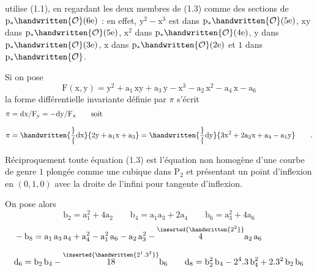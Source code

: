 utilise (1.1), en regardant les deux membres de (1.3) comme des sections de $\mathrm{p}_{*}\handwritten{\mathcal{O}}(6\mathrm{e})$ : en effet, $\mathrm{y}^{2}-\mathrm{x}^{3}$ est dans $\mathrm{p}_{*}\handwritten{\mathcal{O}}(5\mathrm{e})$, $\mathrm{xy}$ dans $\mathrm{p}_{*}\handwritten{\mathcal{O}}(5\mathrm{e})$, $\mathrm{x}^{2}$ dans $\mathrm{p}_{*}\handwritten{\mathcal{O}}(4\mathrm{e})$, $\mathrm{y}$ dans $\mathrm{p}_{*}\handwritten{\mathcal{O}}(3\mathrm{e})$, $\mathrm{x}$ dans $\mathrm{p}_{*}\handwritten{\mathcal{O}}(2\mathrm{e})$ et $1$ dans $\mathrm{p}_{*}\handwritten{\mathcal{O}}$.

Si on pose
\[
\mathrm{F}(\mathrm{x},\mathrm{y})=\mathrm{y}^{2}+\mathrm{a}_{1}\,\mathrm{xy}+\mathrm{a}_{3}\,\mathrm{y}-\mathrm{x}^{3}-\mathrm{a}_{2}\,\mathrm{x}^{2}-\mathrm{a}_{4}\,\mathrm{x}-\mathrm{a}_{6}
\]
la forme différentielle invariante définie par $\pi$ s'écrit
\[
\begin{aligned}
\pi&=\mathrm{dx}/\mathrm{F}_{\mathrm{y}}=-\mathrm{dy}/\mathrm{F}_{\mathrm{x}}\qquad\text{soit}\\[.65em]
\pi&=\handwritten{\frac}{\mathrm{dx}}{2\mathrm{y}+\mathrm{a}_{1}\mathrm{x}+\mathrm{a}_{3}}
=\handwritten{\frac}{\mathrm{dy}}{3\mathrm{x}^{2}+2\mathrm{a}_{2}\mathrm{x}+\mathrm{a}_{4}-\mathrm{a}_{1}\mathrm{y}}\qquad.
\end{aligned}
\]

Réciproquement toute équation (1.3) est l'équation non homogène d'une courbe de genre $1$ plongée comme une cubique dans $\mathrm{P}_{2}$ et présentant un point d'inflexion en $(0,1,0)$ avec la droite de l'infini pour tangente d'inflexion.

On pose alors
\reversemarginpar
\[
\mathrm{b}_{2}=\mathrm{a}_{1}^{2}+4\mathrm{a}_{2}\qquad
\mathrm{b}_{4}=\mathrm{a}_{1}\mathrm{a}_{3}+2\mathrm{a}_{4}\qquad
\mathrm{b}_{6}=\mathrm{a}_{3}^{2}+4\mathrm{a}_{6}
\tag*{(1.4)}
\]
\[
\begin{aligned}
&-\mathrm{b}_{8}=\mathrm{a}_{1}\,\mathrm{a}_{3}\,\mathrm{a}_{4}+\mathrm{a}_{4}^{2}-\mathrm{a}_{1}^{2}\,\mathrm{a}_{6}-\mathrm{a}_{2}\,\mathrm{a}_{3}^{2}-\overset{\inserted{\handwritten{2^{2}}}}{4}\mathrm{a}_{2}\,\mathrm{a}_{6}\\[.55em]
&\mathrm{d}_{6}=\mathrm{b}_{2}\,\mathrm{b}_{4}-\overset{\inserted{\handwritten{2^{1}.3^{2}}}}{18}\mathrm{b}_{6}\qquad
\mathrm{d}_{8}=\mathrm{b}_{2}^{2}\,\mathrm{b}_{4}-2^{4}.3\,\mathrm{b}_{4}^{2}+2.3^{2}\,\mathrm{b}_{2}\,\mathrm{b}_{6}
\end{aligned}
\]
\margin{\handwritten{$\backslash$}}\normalmarginpar

